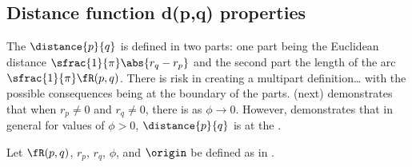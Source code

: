 \subsection{Distance function d(p,q) properties}
The  $\distance{p}{q}$ is defined in two parts: 
one part being the Euclidean distance $\sfrac{1}{\pi}\abs{r_q-r_p}$ and the second part the length of the arc
$\sfrac{1}{\pi}\fR(p,q)$. 
There is risk in creating a multipart definition\ldots 
with the possible consequences being  at the boundary of the parts.
 (next) demonstrates that when $r_p\neq0$ and $r_q\neq0$, 
there is  as $\phi\to0$.
However,  demonstrates that in general for values of $\phi>0$,
$\distance{p}{q}$ is  at the .
\begin{proposition}
\label{prop:larc_lim}
Let $\fR(p,q)$, $r_p$, $r_q$, $\phi$, and $\origin$ be defined as in .
\end{proposition}

